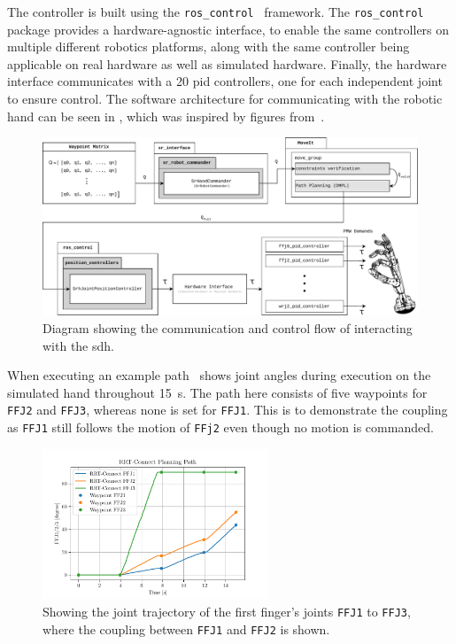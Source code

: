 The controller is built using the \texttt{ros\_control}~\cite{ros-control} framework. The \texttt{ros\_control} package provides a hardware-agnostic interface, to enable the same controllers on multiple different robotics platforms, along with the same controller being applicable on real hardware as well as simulated hardware. Finally, the hardware interface communicates with a \num{20} \gls{pid} controllers, one for each independent joint to ensure control. The software architecture for communicating with the robotic hand can be seen in , which was inspired by figures from~\cite{shadow-robotics-control-description,shadow-robotics-firmware,shadow-robotics-controlling-the-hand}.
\begin{figure}[!h]
		\begin{center}
			\includegraphics[width=\textwidth]{chapters/system-setup/fig/system-communication-scheme.pdf}
		\end{center}
		\caption{Diagram showing the communication and control flow of interacting with the \gls{sdh}.}
		\label{fig:hand-communication-architecture}
\end{figure}

When executing an example path~ shows joint angles during execution on the simulated hand throughout \SI{15}{\second}. The path here consists of five waypoints for \texttt{FFJ2} and \texttt{FFJ3}, whereas none is set for \texttt{FFJ1}. This is to demonstrate the coupling as \texttt{FFJ1} still follows the motion of \texttt{FFj2} even though no motion is commanded.

\begin{figure}[!h]
		\begin{center}
			\includegraphics[width=0.6\textwidth]{chapters/system-setup/fig/q-angles.pdf}
		\end{center}
		\caption{Showing the joint trajectory of the first finger's joints \texttt{FFJ1} to \texttt{FFJ3}, where the coupling between \texttt{FFJ1} and \texttt{FFJ2} is shown.}
		\label{fig:coupling-and-planning-graph}
\end{figure}

